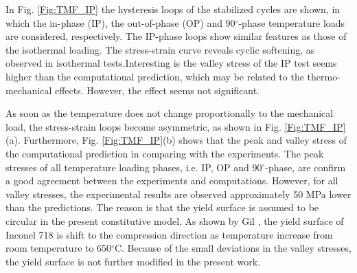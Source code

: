 \documentclass[preprint,5p,twocolumn,11pt,sort&compress]{elsarticle}
\begin{document}
In Fig. \ref{Fig:TMF_IP} the hysteresis loops of the stabilized cycles are shown, in which the in-phase (IP), the out-of-phase (OP) and 90$^\circ$-phase temperature loads are considered, respectively.
The IP-phase loops show similar features as those of the isothermal loading.
The stress-strain curve reveals cyclic softening, as observed in isothermal tests.Interesting is the valley stress of the IP test seems higher than the computational prediction, which may be related to the thermo-mechanical effects. However, the effect seems not significant.

As soon as the temperature does not change proportionally to the mechanical load, the stress-strain loops become asymmetric, as shown in Fig. \ref{Fig:TMF_IP}(a).
Furthermore, Fig. \ref{Fig:TMF_IP}(b) shows that the peak and valley stress of the computational prediction in comparing with the experiments.
The peak stresses of all temperature loading phases, i.e. IP, OP and 90$^\circ$-phase, are confirm a good agreement between the experiments and computations.
However, for all valley stresses, the experimental results are observed approximately 50 MPa lower than the predictions.
The reason is that the yield surface is assumed to be circular in the present constitutive model.
As shown by Gil \cite{Gil1998}, the yield surface of Inconel 718 is shift to the compression direction as temperature increase from room temperature to 650$^{\circ}$C.
Because of the small deviations in the valley stresses, the yield surface is not further modified in the present work.

\end{document}

